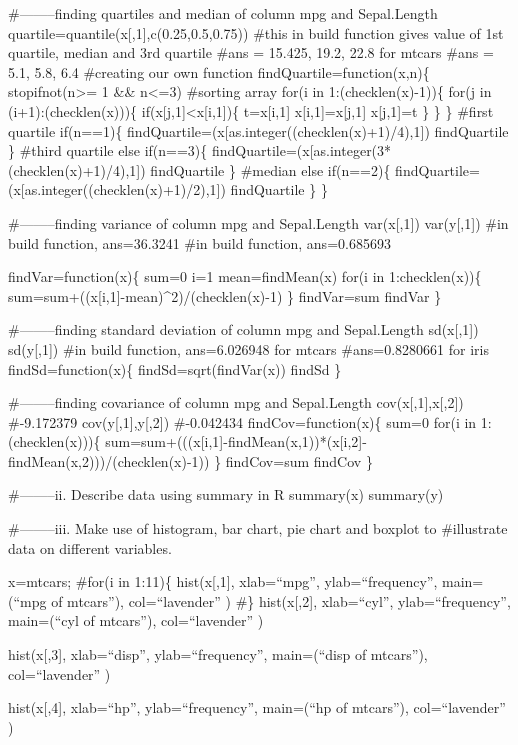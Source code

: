 \documentclass[
]{article}
\begin{document}
\#--------finding quartiles and median of column mpg and Sepal.Length
quartile=quantile(x{[},1{]},c(0.25,0.5,0.75)) \#this in build function
gives value of 1st quartile, median and 3rd quartile \#ans = 15.425,
19.2, 22.8 for mtcars \#ans = 5.1, 5.8, 6.4 \#creating our own function
findQuartile=function(x,n)\{ stopifnot(n\textgreater= 1 \&\&
n\textless=3) \#sorting array for(i in 1:(checklen(x)-1))\{ for(j in
(i+1):(checklen(x)))\{ if(x{[}j,1{]}\textless x{[}i,1{]})\{ t=x{[}i,1{]}
x{[}i,1{]}=x{[}j,1{]} x{[}j,1{]}=t \} \} \} \#first quartile if(n==1)\{
findQuartile=(x{[}as.integer((checklen(x)+1)/4),1{]}) findQuartile \}
\#third quartile else if(n==3)\{
findQuartile=(x{[}as.integer(3*(checklen(x)+1)/4),1{]}) findQuartile \}
\#median else if(n==2)\{
findQuartile=(x{[}as.integer((checklen(x)+1)/2),1{]}) findQuartile \} \}

\#--------finding variance of column mpg and Sepal.Length var(x{[},1{]})
var(y{[},1{]}) \#in build function, ans=36.3241 \#in build function,
ans=0.685693

findVar=function(x)\{ sum=0 i=1 mean=findMean(x) for(i in
1:checklen(x))\{ sum=sum+((x{[}i,1{]}-mean)\^{}2)/(checklen(x)-1) \}
findVar=sum findVar \}

\#--------finding standard deviation of column mpg and Sepal.Length
sd(x{[},1{]}) sd(y{[},1{]}) \#in build function, ans=6.026948 for mtcars
\#ans=0.8280661 for iris findSd=function(x)\{ findSd=sqrt(findVar(x))
findSd \}

\#--------finding covariance of column mpg and Sepal.Length
cov(x{[},1{]},x{[},2{]}) \#-9.172379 cov(y{[},1{]},y{[},2{]})
\#-0.042434 findCov=function(x)\{ sum=0 for(i in 1:(checklen(x)))\{
sum=sum+(((x{[}i,1{]}-findMean(x,1))*(x{[}i,2{]}-findMean(x,2)))/(checklen(x)-1))
\} findCov=sum findCov \}

\#--------ii. Describe data using summary in R summary(x) summary(y)

\#--------iii. Make use of histogram, bar chart, pie chart and boxplot
to \#illustrate data on different variables.

x=mtcars; \#for(i in 1:11)\{ hist(x{[},1{]}, xlab=``mpg'',
ylab=``frequency'', main=(``mpg of mtcars''), col=``lavender'' ) \#\}
hist(x{[},2{]}, xlab=``cyl'', ylab=``frequency'', main=(``cyl of
mtcars''), col=``lavender'' )

hist(x{[},3{]}, xlab=``disp'', ylab=``frequency'', main=(``disp of
mtcars''), col=``lavender'' )

hist(x{[},4{]}, xlab=``hp'', ylab=``frequency'', main=(``hp of
mtcars''), col=``lavender'' )
\end{document}
